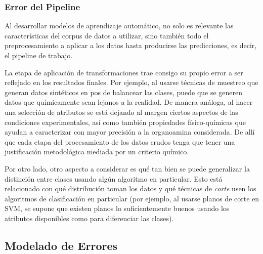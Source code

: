 \subsubsection{Error del Pipeline}

Al desarrollar modelos de aprendizaje automático, no solo es relevante las características del corpus de datos a utilizar, sino también todo el preprocesamiento a aplicar a los datos hasta producirse las predicciones, es decir, el pipeline de trabajo.


La etapa de aplicación de transformaciones trae consigo su propio error a ser reflejado en los resultados finales. Por ejemplo, al usarse técnicas de muestreo que generan datos sintéticos en pos de balancear las clases, puede que se generen datos que químicamente sean lejanos a la realidad. De manera análoga, al hacer una selección de atributos se está dejando al margen ciertos aspectos de las condiciones experimentales, así como también propiedades físico-químicas que ayudan a caracterizar con mayor precisión a la organoamina considerada. De allí que cada etapa del procesamiento de los datos crudos tenga que tener una justificación metodológica mediada por un criterio químico.

Por otro lado, otro aspecto a considerar es qué tan bien se puede generalizar la distinción entre clases usando algún algoritmo en particular. Esto está relacionado con qué distribución toman los datos y qué técnicas de \textit{corte} usen los algoritmos de clasificación en particular (por ejemplo, al usarse planos de corte en SVM, se supone que existen planos lo suficientemente buenos usando los atributos disponibles como para diferenciar las clases). 


\subsection{Modelado de Errores}


